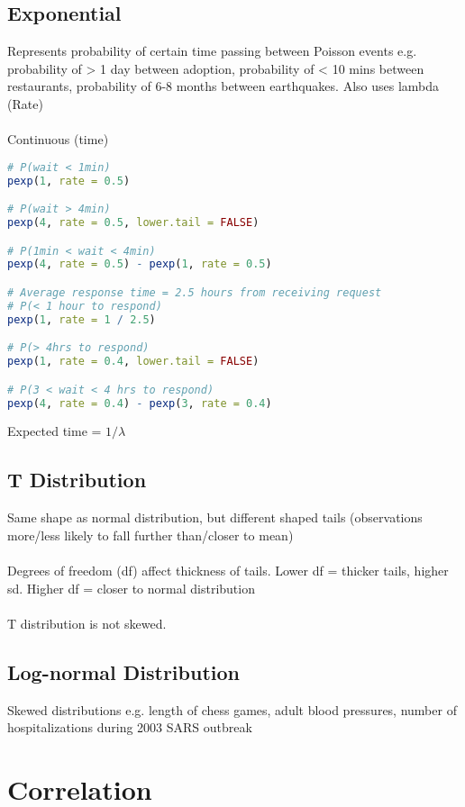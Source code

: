 \documentclass[11pt]{article}
\begin{document}
\subsection{Exponential}

Represents probability of certain time passing between Poisson events e.g. probability of > 1 day between adoption, probability of < 10 mins between restaurants, probability of 6-8 months between earthquakes. Also uses lambda (Rate) \\ \;  \\
Continuous (time)	

\begin{lstlisting}[language=R]
# P(wait < 1min)
pexp(1, rate = 0.5)

# P(wait > 4min)
pexp(4, rate = 0.5, lower.tail = FALSE)

# P(1min < wait < 4min)
pexp(4, rate = 0.5) - pexp(1, rate = 0.5)

# Average response time = 2.5 hours from receiving request
# P(< 1 hour to respond)
pexp(1, rate = 1 / 2.5)

# P(> 4hrs to respond)
pexp(1, rate = 0.4, lower.tail = FALSE)

# P(3 < wait < 4 hrs to respond)
pexp(4, rate = 0.4) - pexp(3, rate = 0.4)
\end{lstlisting}

Expected time = $1 / \lambda$

\subsection{T Distribution}
Same shape as normal distribution, but different shaped tails (observations more/less likely to fall further than/closer to mean) \\ \; \\
Degrees of freedom (df) affect thickness of tails. Lower df = thicker tails, higher sd. Higher df = closer to normal distribution \\ \; \\
T distribution is not skewed. 

\subsection{Log-normal Distribution}
Skewed distributions e.g. length of chess games, adult blood pressures, number of hospitalizations during 2003 SARS outbreak

\newpage
\section{Correlation}
\end{document}
